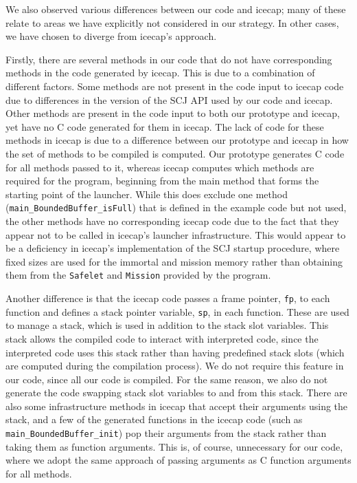 {We also observed various differences between our code and icecap; many
of these relate to areas we have explicitly not considered in our
strategy.
In other cases, we have chosen to diverge from icecap's approach.

Firstly, there are several methods in our code that do not have
corresponding methods in the code generated by icecap.
This is due to a combination of different factors.
Some methods are not present in the code input to icecap code due to
differences in the version of the SCJ API used by our code and icecap.
Other methods are present in the code input to both our prototype and
icecap, yet have no C code generated for them in icecap.
The lack of code for these methods in icecap is due to a difference
between our prototype and icecap in how the set of methods to be
compiled is computed.
Our prototype generates C code for all methods passed to it, whereas
icecap computes which methods are required for the program, beginning
from the main method that forms the starting point of the launcher.
While this does exclude one method
(\texttt{main\_BoundedBuffer\_isFull}) that is defined in the example
code but not used, the other methods have no corresponding icecap code
due to the fact that they appear not to be called in icecap's launcher
infrastructure.
This would appear to be a deficiency in icecap's implementation of the
SCJ startup procedure, where fixed sizes are used for the immortal and
mission memory rather than obtaining them from the \texttt{Safelet}
and \texttt{Mission} provided by the program.

Another difference is that the icecap code passes a frame pointer,
\texttt{fp}, to each function and defines a stack pointer variable,
\texttt{sp}, in each function.
These are used to manage a stack, which is used in addition to the
stack slot variables.
This stack allows the compiled code to interact with interpreted code,
since the interpreted code uses this stack rather than having
predefined stack slots (which are computed during the compilation
process).
We do not require this feature in our code, since all our code is
compiled.
For the same reason, we also do not generate the code swapping stack
slot variables to and from this stack.
There are also some infrastructure methods in icecap that accept their
arguments using the stack, and a few of the generated functions in the
icecap code (such as \texttt{main\_BoundedBuffer\_init}) pop their
arguments from the stack rather than taking them as function
arguments.
This is, of course, unnecessary for our code, where we adopt the same
approach of passing arguments as C function arguments for all methods.

}

